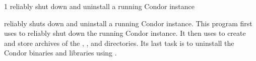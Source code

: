 \begin{ManPage}{\label{man-condor-cold-stop}}{1}
{reliably shut down and uninstall a running Condor instance}

\Synopsis {}



\Description 
{} reliably shuts down and uninstall a
running Condor instance.  
This program first uses  to
reliably shut down the running Condor instance.
It then uses  to create and store archives of the
, , and  directories.
Its last task is to 
uninstall the Condor binaries and libraries using .


\end{ManPage}
